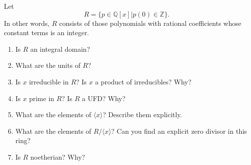 \documentclass[12pt,letterpaper,boxed]{hmcpset}
\begin{document}
\begin{solution}
\end{solution}

\clearpage

\begin{problem}[18.3.13]
Let $$R = \{p \in \mathbb{Q}[x] \vert p(0) \in \mathbb{Z}\}.$$
In other words, $R$ consists of those polynomials with rational coefficients whose constant terms is an integer.
\begin{enumerate}[label=\alph*]
\item Is $R$ an integral domain?
\item What are the units of $R$?
\item Is $x$ irreducible in $R$? Is $x$ a product of irreducibles? Why?
\item Is $x$ prime in $R$? Is $R$ a UFD? Why?
\item What are the elements of $\langle x \rangle$? Describe them explicitly.
\item What are the elements of $R/\langle x \rangle$? Can you find an explicit zero divisor in this ring?
\item Is $R$ noetherian? Why?
\end{enumerate}
\end{problem}

\begin{solution}
\end{solution}
\end{document}

